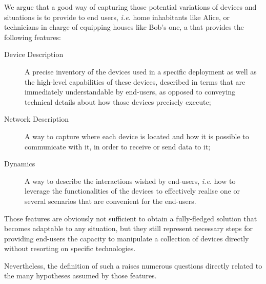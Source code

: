 We argue that a good way of capturing those potential variations of devices and situations is to provide to end users, \textit{i.e.} home inhabitants like Alice, or technicians in charge of equipping houses like Bob's one, a \DSL that provides the following features:

\begin{description}
	\item[Device Description] A precise inventory of the devices used in a specific deployment as well as the high-level capabilities of these devices, described in terms that are immediately understandable by end-users, as opposed to conveying technical details about how those devices precisely execute;
	
	\item[Network Description] A way to capture where each device is located and how it is possible to communicate with it, in order to receive or send data to it;

	\item[Dynamics] A way to describe the interactions wished by end-users, \textit{i.e.} how to leverage the functionalities of the devices to effectively realise one or several scenarios that are convenient for the end-users.  
	
\end{description}
Those features are obviously not sufficient to obtain a fully-fledged solution that becomes adaptable to any situation, but they still represent necessary steps for providing end-users the capacity to manipulate a collection of devices directly without resorting on specific technologies.

Nevertheless, the definition of such a \DSL raises numerous questions directly related to the many hypotheses assumed by those \DSL features.

